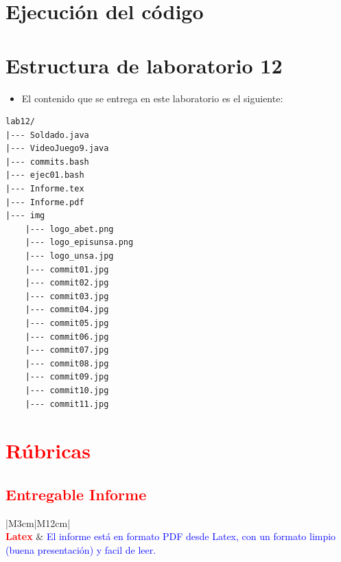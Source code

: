 \documentclass{article}
\newcommand{\itemPracticeNumber}{12}
\begin{document}
\section{Ejecución del código}

\pagebreak

\section{Estructura de laboratorio \itemPracticeNumber}
\begin{itemize}
	\item El contenido que se entrega en este laboratorio es el siguiente:
\end{itemize}
\begin{lstlisting}[style=ascii-tree]
lab12/
|--- Soldado.java
|--- VideoJuego9.java
|--- commits.bash
|--- ejec01.bash
|--- Informe.tex
|--- Informe.pdf
|--- img
	|--- logo_abet.png
	|--- logo_episunsa.png
	|--- logo_unsa.jpg
	|--- commit01.jpg
	|--- commit02.jpg
	|--- commit03.jpg
	|--- commit04.jpg
	|--- commit05.jpg
	|--- commit06.jpg
	|--- commit07.jpg
	|--- commit08.jpg
	|--- commit09.jpg
	|--- commit10.jpg
	|--- commit11.jpg
\end{lstlisting}
\pagebreak

\section{\textcolor{red}{Rúbricas}}

\subsection{\textcolor{red}{Entregable Informe}}
\begin{table}[H]
	\caption{Tipo de Informe}
	\setlength{\tabcolsep}{0.5em} %
	{\renewcommand{\arraystretch}{1.5}%
		\begin{tabular}{|M{3cm}|M{12cm}|}
			\hline
			                                                                                                      \\
			\hline
			\textbf{\textcolor{red}{Latex}} & \textcolor{blue}{El informe está en formato PDF desde Latex,  con un formato limpio (buena presentación) y facil de leer.} \\
			\hline
		\end{tabular}
	}
\end{table}
\end{document}
